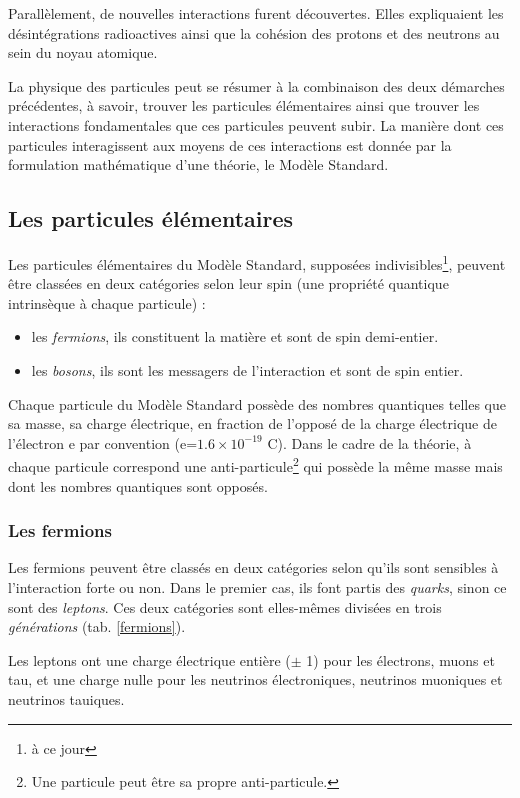 Parallèlement, de nouvelles interactions furent découvertes. Elles expliquaient les désintégrations radioactives ainsi que la cohésion des protons et des neutrons au sein du noyau atomique.

La physique des particules peut se résumer à la combinaison des deux démarches précédentes, à savoir, trouver les particules élémentaires ainsi que trouver les interactions fondamentales que ces particules peuvent subir. La manière dont ces particules interagissent aux moyens de ces interactions est donnée par la formulation mathématique d'une théorie, le Modèle Standard.

\subsection{Les particules élémentaires}
Les particules élémentaires du Modèle Standard, supposées indivisibles\footnote{à ce jour}, peuvent être classées en deux catégories selon leur spin (une propriété quantique intrinsèque à chaque particule) :
\begin{itemize}[label=$\bullet$]
\item les \textit{fermions}, ils constituent la matière et sont de spin demi-entier.
\item les \textit{bosons}, ils sont les messagers de l'interaction et sont de spin entier.
\end{itemize}
Chaque particule du Modèle Standard possède des nombres quantiques telles que sa masse, sa charge électrique, en fraction de l'opposé de la charge électrique de l'électron e par convention (e=$1.6\times10^{-19}$ C). Dans le cadre de la théorie, à chaque particule correspond une anti-particule\footnote{Une particule peut être sa propre anti-particule.} qui possède la même masse mais dont les nombres quantiques sont opposés.

\subsubsection{Les fermions}
Les fermions peuvent être classés en deux catégories selon qu'ils sont sensibles à l'interaction forte ou non. Dans le premier cas, ils font partis des \textit{quarks}, sinon ce sont des \textit{leptons}. Ces deux catégories sont elles-mêmes divisées en trois \textit{générations} (tab. \ref{fermions}).

Les leptons ont une charge électrique entière ($\pm$ 1) pour les électrons, muons et tau, et une charge nulle pour les neutrinos électroniques, neutrinos muoniques et neutrinos tauiques.

